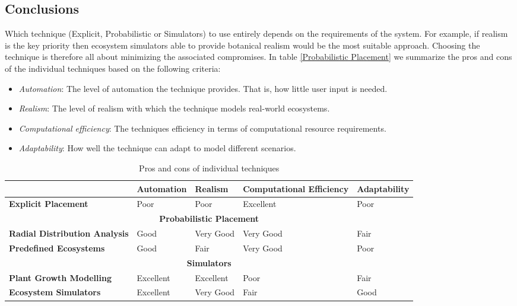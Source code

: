 \subsection{Conclusions} \label{Conclusions}

Which technique (Explicit, Probabilistic or Simulators) to use entirely depends on the requirements of the system. For example, if realism is the key priority then ecosystem simulators able to provide botanical realism would be the most suitable approach. Choosing the technique is therefore all about minimizing the associated compromises. In table \ref{Probabilistic Placement} we summarize the pros and cons of the individual techniques based on the following criteria: 
\begin{itemize}
\item \textit{Automation}: The level of automation the technique provides. That is, how little user input is needed.
\item \textit{Realism}: The level of realism with which the technique models real-world ecosystems.
\item \textit{Computational efficiency}: The techniques efficiency in terms of computational resource requirements.
\item \textit{Adaptability}: How well the technique can adapt to model different scenarios.
\end{itemize}
\begin{table}[h]
  \centering
	  \label{Pros and cons of individual techniques}
	    \begin{tabular}{|p{4cm}|p{3cm}|p{3cm}|p{3cm}|p{3cm}|}
  	    \hline	
  	      & \textbf{Automation} & \textbf{Realism} & \textbf{Computational Efficiency} & \textbf{Adaptability} \\
		\hline	
		\textbf{Explicit Placement} & 
		 Poor  & Poor  & Excellent & Poor      \\
  	    \hline	
  	    \multicolumn{5}{|c|}{\textbf{Probabilistic Placement}} \\
  	    \hline				
  	    \textbf{Radial Distribution Analysis} & 
		 Good & Very Good & Very Good & Fair   \\
  	    \hline
		\textbf{Predefined Ecosystems} & 
		 Good & Fair & Very Good & Poor      \\
  	    \hline
		\multicolumn{5}{|c|}{\textbf{Simulators}} \\
  	    \hline		
		\textbf{Plant Growth Modelling} & 
		 Excellent & Excellent & Poor & Fair  \\
  	    \hline
		\textbf{Ecosystem Simulators} & 
		 Excellent & Very Good & Fair & Good   \\
  	    \hline
  	    \end{tabular}
  \caption[Pros and cons of individual techniques]{Pros and cons of individual techniques}
\end{table}

